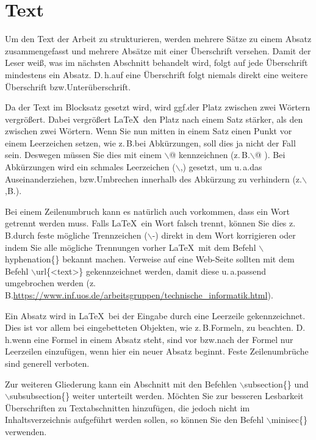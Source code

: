 \section{Text}
Um den Text der Arbeit zu strukturieren, werden mehrere Sätze zu einem Absatz
zusammengefasst und mehrere Absätze mit einer Überschrift versehen.
Damit der Leser weiß, was im nächsten Abschnitt behandelt wird,
folgt auf jede Überschrift mindestens ein Absatz.
D.\,h.\@ auf eine Überschrift folgt niemals direkt eine weitere Überschrift
bzw.\@ Unterüberschrift.

Da der Text im Blocksatz gesetzt wird, wird ggf.\@ der Platz zwischen
zwei Wörtern vergrößert.
Dabei vergrößert \LaTeX\ den Platz nach einem Satz stärker,
als den zwischen zwei Wörtern.
Wenn Sie nun mitten in einem Satz einen Punkt vor einem Leerzeichen setzen,
wie z.\,B.\@ bei Abkürzungen, soll dies ja nicht der Fall sein.
Deswegen müssen Sie dies mit einem $\backslash$@ kennzeichnen
(z.\,B.$\backslash$@ ).
Bei Abkürzungen wird ein schmales Leerzeichen ($\backslash$,) gesetzt, 
um u.\,a.\@ das Auseinanderziehen, bzw.\@ Umbrechen innerhalb des Abkürzung 
zu verhindern (z.$\backslash$,B.).

Bei einem Zeilenumbruch kann es natürlich auch vorkommen, dass ein Wort
getrennt werden muss. Falls \LaTeX\ ein Wort falsch trennt, können Sie dies
z.\,B.\@ durch feste mögliche Trennzeichen ($\backslash$-) direkt in dem Wort
korrigieren oder indem Sie alle mögliche Trennungen vorher \LaTeX\
mit dem Befehl $\backslash$hyphenation\{\} bekannt machen.
Verweise auf eine Web-Seite sollten mit dem Befehl $\backslash$url\{<text>\} gekennzeichnet werden,
damit diese u.\,a.\@ passend umgebrochen werden (z.\,B.\@ \url{https://www.inf.uos.de/arbeitsgruppen/technische_informatik.html}).

Ein Absatz wird in \LaTeX\ bei der Eingabe durch eine Leerzeile gekennzeichnet.
Dies ist vor allem bei eingebetteten Objekten, wie z.\,B.\@ Formeln, zu beachten.
D.\,h.\@ wenn eine Formel in einem Absatz steht, sind vor bzw.\@ nach der Formel
nur Leerzeilen einzufügen, wenn hier ein neuer Absatz beginnt.
Feste Zeilenumbrüche sind generell verboten.

Zur weiteren Gliederung kann ein Abschnitt mit den Befehlen $\backslash$subsection\{\} und $\backslash$subsubsection\{\} weiter unterteilt werden. Möchten Sie zur besseren Lesbarkeit Überschriften zu Textabschnitten hinzufügen, die jedoch nicht im Inhaltsverzeichnis aufgeführt werden sollen, so können Sie den Befehl $\backslash$minisec\{\} verwenden.


